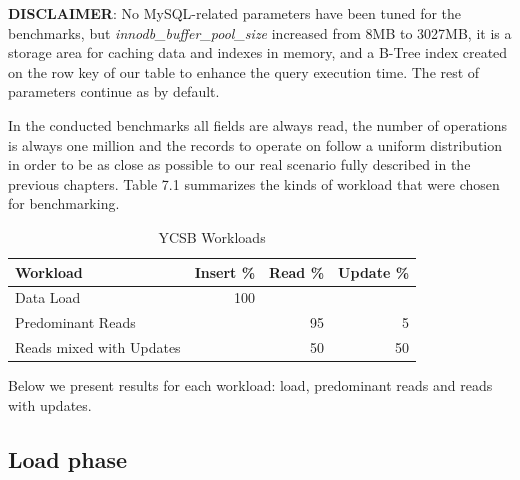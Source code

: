 \bigskip

\textbf{DISCLAIMER}: No MySQL-related parameters have been tuned for the benchmarks, but \textit{innodb\_buffer\_pool\_size} increased from 8MB to 3027MB, it is a storage area for caching data and indexes in memory, and a B-Tree index created on the row key of our table to enhance the query execution time. The rest of parameters continue as by default.

\bigskip

In the conducted benchmarks all fields are always read, the number of operations is always one million and the records to operate on follow a uniform distribution in order to be as close as possible to our real scenario fully described in the previous chapters. Table 7.1 summarizes the kinds of workload that were chosen for benchmarking.

\begin{table}[htbp]

\begin{center}
\begin{tabular}{|l|l|l|l|}
\hline
Workload & Insert \% & Read \% & Update \% \\ \hline
Data Load & \multicolumn{1}{r|}{100} &  &  \\ \hline
Predominant Reads &  & \multicolumn{1}{r|}{95} & \multicolumn{1}{r|}{5} \\ \hline
Reads mixed with Updates &  & \multicolumn{1}{r|}{50} & \multicolumn{1}{r|}{50} \\ \hline
\end{tabular}
\caption{YCSB Workloads}
\end{center}

\label{Table YCSB Workloads.}
\end{table}

\par
Below we present results for each workload: load, predominant reads and reads with updates.


\subsection{Load phase}



